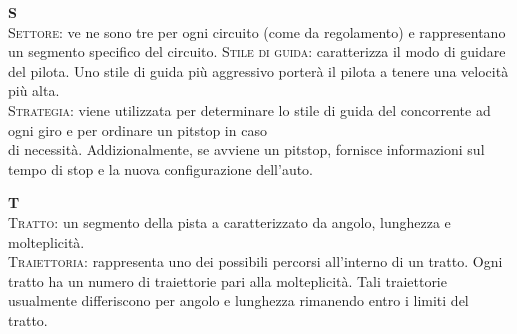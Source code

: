 \begin{list}{}
\item \textbf{S}\\
\textsc{Settore}: ve ne sono tre per ogni circuito (come da regolamento) e rappresentano un segmento specifico del circuito.
\textsc{Stile di guida}: caratterizza il modo di guidare del pilota. Uno stile di guida pi\`{u} aggressivo porter\`{a} il pilota
a tenere una velocit\`{a} pi\`{u} alta.\\
\textsc{Strategia}: viene utilizzata per determinare lo stile di guida del concorrente ad ogni giro e per ordinare un pitstop in caso\\
di necessit\`{a}. Addizionalmente, se avviene un pitstop, fornisce informazioni sul tempo di stop e la nuova configurazione dell'auto.\\
\item \textbf{T}\\
\textsc{Tratto}: un segmento della pista a caratterizzato da angolo, lunghezza e molteplicit\`{a}.\\
\textsc{Traiettoria}: rappresenta uno dei possibili percorsi all'interno di un tratto. Ogni tratto ha un numero di traiettorie pari alla
molteplicit\`{a}. Tali traiettorie usualmente differiscono per angolo e lunghezza rimanendo entro i limiti del tratto.\\
\end{list}
